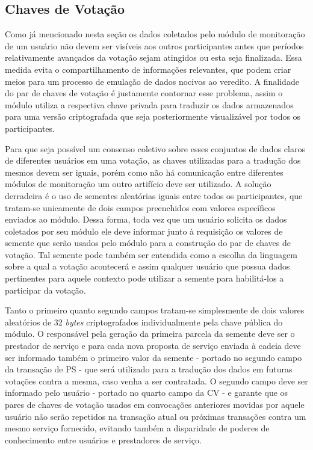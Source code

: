 \subsection{Chaves de Votação}
\label{subsec:chaves_votacao}

Como já mencionado nesta seção os dados coletados pelo módulo de monitoração de um usuário não devem ser visíveis aos outros participantes antes que períodos relativamente avançados da votação sejam atingidos ou esta seja finalizada. Essa medida evita o compartilhamento de informações relevantes, que podem criar meios para um processo de emulação de dados nocivos ao veredito. A finalidade do par de chaves de votação é justamente contornar esse problema, assim o módulo utiliza a respectiva chave privada para traduzir os dados armazenados para uma versão criptografada que seja posteriormente visualizável por todos os participantes. 

%
Para que seja possível um consenso coletivo sobre esses conjuntos de dados claros de diferentes usuários em uma votação, as chaves utilizadas para a tradução dos mesmos devem ser iguais, porém como não há comunicação entre diferentes módulos de monitoração um outro artifício deve ser utilizado. A solução derradeira é o uso de sementes aleatórias iguais entre todos os participantes, que tratam-se unicamente de dois campos preenchidos com valores específicos enviados ao módulo. Dessa forma, toda vez que um usuário solicita os dados coletados por seu módulo ele deve informar junto à requisição os valores de semente que serão usados pelo módulo para a construção do par de chaves de votação. Tal semente pode também ser entendida como a escolha da linguagem sobre a qual a votação acontecerá e assim qualquer usuário que possua dados pertinentes para aquele contexto pode utilizar a semente para habilitá-los a participar da votação.

Tanto o primeiro quanto segundo campos tratam-se simplesmente de dois valores aleatórios de 32 \textit{bytes} criptografados individualmente pela chave pública do módulo. O responsável pela geração da primeira parcela da semente deve ser o prestador de serviço e para cada nova proposta de serviço enviada à cadeia deve ser informado também o primeiro valor da semente - portado no segundo campo da transação de \ac{PS} - que será utilizado para a tradução dos dados em futuras votações contra a mesma, caso venha a ser contratada. O segundo campo deve ser informado pelo usuário - portado no quarto campo da \ac{CV} - e garante que os pares de chaves de votação usados em convocações anteriores movidas por aquele usuário não serão repetidos na transação atual ou próximas transações contra um mesmo serviço fornecido, evitando também a disparidade de poderes de conhecimento entre usuários e prestadores de serviço.

